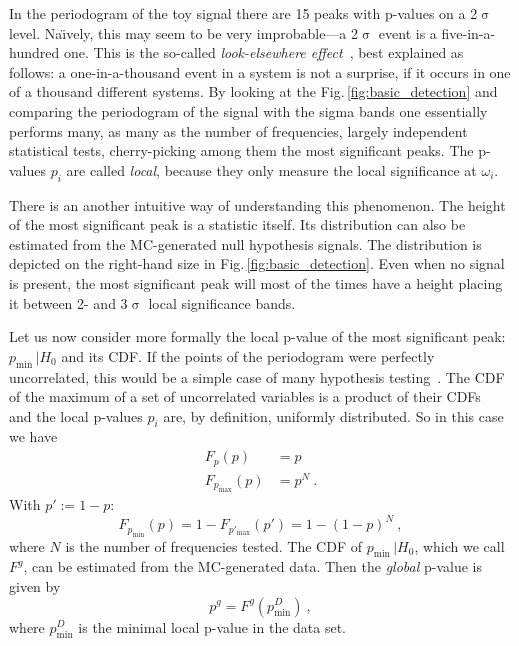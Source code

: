 In the periodogram of the toy signal there are 15 peaks with p-values on a 2$\upsigma$ level.
Na\"\i vely, this may seem to be very improbable---a 2$\upsigma$ event is a five-in-a-hundred one.
This is the so-called \emph{look-elsewhere effect}~\cite{PDG2016}, best explained as follows: a one-in-a-thousand event in a system is not a surprise, if it occurs in one of a thousand different systems.
By looking at the Fig.\,\ref{fig:basic_detection} and comparing the periodogram of the signal with the sigma bands one essentially performs many, as many as the number of frequencies, largely independent statistical tests, cherry-picking among them the most significant peaks.
The p-values $p_i$ are called \emph{local}, because they only measure the local significance at $\omega_i$.

There is an another intuitive way of understanding this phenomenon.
The height of the most significant peak is a statistic itself.
Its distribution can also be estimated from the MC-generated null hypothesis signals.
The distribution is depicted on the right-hand size in Fig.\,\ref{fig:basic_detection}.
Even when no signal is present, the most significant peak will most of the times have a height placing it between 2- and 3$\upsigma$ local significance bands.

Let us now consider more formally the local p-value of the most significant peak: $p_\text{min} \, | H_0$ and its CDF\@.
If the points of the periodogram were perfectly uncorrelated, this would be a simple case of many hypothesis testing~\cite{Algeri2016}.
The CDF of the maximum of a set of uncorrelated variables is a product of their CDFs~\cite{Papoulis2002} and the local p-values $p_i$ are, by definition, uniformly distributed.
So in this case we have
\begin{align}\label{eq:Fpmin}
  F_p(p) &= p \\
  F_{p_\text{max}}(p) &= p^N \ .
\end{align}
With $p' := 1 - p$:
\begin{equation}
  F_{p_\text{min}}(p) = 1 - F_{p'_\text{max}}(p') = 1 - {(1 - p)}^N \ ,
  \label{eq:global_CDF_functional_form}
\end{equation}
where $N$ is the number of frequencies tested.
The CDF of $p_\text{min} \, | H_0$, which we call $F^g$, can be estimated from the MC-generated data.
Then the \emph{global} p-value is given by
\begin{equation}
  p^g = F^g(p_\text{min}^D) \ ,
\end{equation}
where $p_\text{min}^D$ is the minimal local p-value in the data set.

